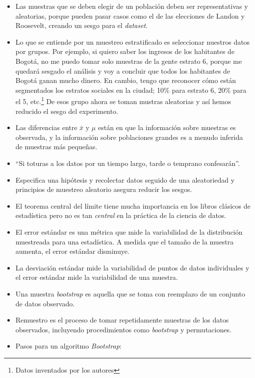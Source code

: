 \documentclass[12pt]{article}\usepackage[]{graphicx}\usepackage[]{xcolor}
\begin{document}
\begin{itemize}
  \item Las muestras que se deben elegir de un población deben ser representativas y aleatorias, porque pueden pasar casos como el de las elecciones de Landon y Roosevelt, creando un sesgo para el \textit{dataset}.
  \item Lo que se entiende por un muestreo estratificado es seleccionar nuestros datos por grupos. Por ejemplo, si quiero saber los ingresos de los habitantes de Bogotá, no me puedo tomar solo muestras de la gente estrato 6, porque me quedará sesgado el análisis y voy a concluir que todos los habitantes de Bogotá ganan mucho dinero. En cambio, tengo que reconocer cómo están segmentados los estratos sociales en la ciudad; 10\% para estrato 6, 20\% para el 5, etc.\footnote{Datos inventados por los autores} De esos grupo ahora se toman mustras aleatorias y así hemos reducido el sesgo del experimento.
  \item Las diferencias entre $\bar{x}$ y $\mu$ están en que la información sobre muestras es observada, y la información sobre poblaciones grandes es a menudo inferida de muestras más pequeñas.
  \item ``Si toturas a los datos por un tiempo largo, tarde o temprano confesarán''.
  \item Especifica una hipótesis y recolectar datos seguido de una aleatoriedad y principios de muestreo aleatorio asegura reducir los sesgos.
  \item El teorema central del límite tiene mucha importancia en los libros clásicos de estadística pero no es tan \textit{central} en la práctica de la ciencia de datos.
  \item El error estándar es una métrica que mide la variabilidad de la distribución muestreada para una estadística. A medida que el tamaño de la muestra aumenta, el error estándar disminuye.
  \item La desviación estándar mide la variabilidad de puntos de datos individuales y el error estándar mide la variabilidad de una muestra.
  \item Una muestra \textit{bootstrap} es aquella que se toma con reemplazo de un conjunto de datos observado.
  \item Remuestro es el proceso de tomar repetidamente muestras de los datos observados, incluyendo procedimientos como \textit{bootstrap} y permutaciones.
  \item Pasos para un algoritmo \textit{Bootstrap}:
        \begin{enumerate}

\end{enumerate}
\end{itemize}
\end{document}
